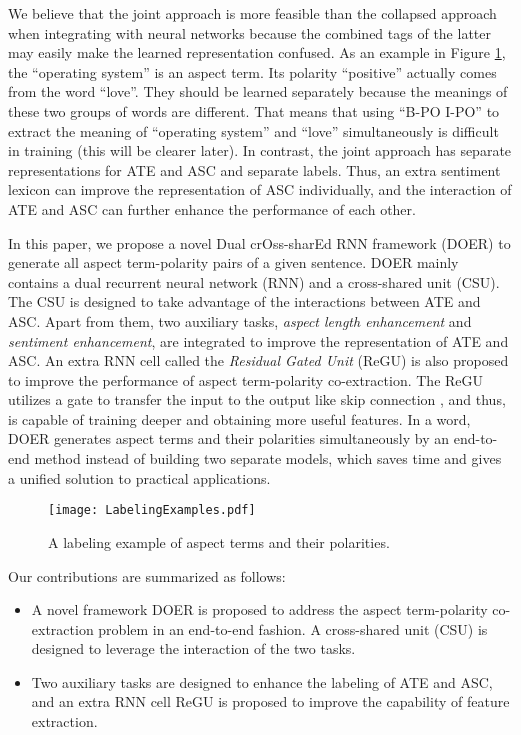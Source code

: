 \documentclass[11pt,a4paper]{article}
\begin{document}
	We believe that the joint approach is more feasible than the collapsed approach when integrating with neural networks because the combined tags of the latter may easily make the learned representation confused. As an example in Figure \ref{table_labeling_examples}, the ``operating system'' is an aspect term. Its polarity ``positive'' actually comes from the word ``love''. They should be learned separately because the meanings of these two groups of words are different. That means that using ``B-PO I-PO'' to extract the meaning of ``operating system'' and ``love'' simultaneously is difficult in training (this will be clearer later). In contrast, the joint approach has separate representations for ATE and ASC and separate labels. Thus, an extra sentiment lexicon can improve the representation of ASC individually, and the interaction of ATE and ASC can further enhance the performance of each other.
	
	In this paper, we propose a novel Dual crOss-sharEd RNN framework (DOER) to generate all aspect term-polarity pairs of a given sentence. DOER mainly contains a dual recurrent neural network (RNN) and a cross-shared unit (CSU). The CSU is designed to take advantage of the interactions between ATE and ASC. Apart from them, two auxiliary tasks, \textit{aspect length enhancement} and \textit{sentiment enhancement}, are integrated to improve the representation of ATE and ASC. An extra RNN cell called the \textit{Residual Gated Unit} (ReGU) is also proposed to improve the performance of aspect term-polarity co-extraction. The ReGU utilizes a gate to transfer the input to the output like skip connection \cite{He2016}, and thus, is capable of training deeper and obtaining more useful features. In a word, DOER generates aspect terms and their polarities simultaneously by an end-to-end method instead of building two separate models, which saves time and gives a unified solution to practical applications.
	\begin{figure}[tbp]
		\centering
		\texttt{[image: LabelingExamples.pdf]}
		\caption{A labeling example of aspect terms and their polarities.}\label{table_labeling_examples}
	\end{figure}
	
	Our contributions are summarized as follows:
	
	\begin{itemize}
		\item A novel framework DOER is proposed to address the aspect term-polarity co-extraction problem in an end-to-end fashion. A cross-shared unit (CSU) is designed to leverage the interaction of the two tasks.
		\item Two auxiliary tasks are designed to enhance the labeling of ATE and ASC, and an extra RNN cell ReGU is proposed to improve the capability of feature extraction.
	\end{itemize}
\end{document}
